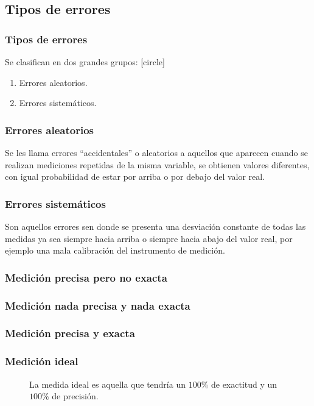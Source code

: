 \subsection{Tipos de errores}
\begin{frame}
\frametitle{Tipos de errores}
Se clasifican en dos grandes grupos:
[circle]
\begin{enumerate}[<+->]
\item Errores aleatorios.
\item Errores sistemáticos.
\end{enumerate}
\end{frame}
\begin{frame}
\frametitle{Errores aleatorios}
Se les llama errores \enquote{accidentales} o aleatorios a aquellos que aparecen cuando se realizan mediciones repetidas de la misma variable, se obtienen valores diferentes, con igual probabilidad de estar por arriba o por debajo del valor real.
\end{frame}
\begin{frame}
\frametitle{Errores sistemáticos}
Son aquellos errores sen donde se presenta una desviación constante de todas las medidas ya sea siempre hacia arriba o siempre hacia abajo del valor real, por ejemplo una mala calibración del instrumento de medición.
\end{frame}
\begin{frame}[plain]
\frametitle{Medición precisa pero no exacta}
\begin{figure}
    \centering
    
\end{figure}
\end{frame}
\begin{frame}[plain]
\frametitle{Medición nada precisa y nada exacta}
\begin{figure}
    \centering
    
\end{figure}
\end{frame}
\begin{frame}[plain]
\frametitle{Medición precisa y exacta}
\begin{figure}
    \centering
    
\end{figure}
\end{frame}
\begin{frame}[plain]
\frametitle{Medición ideal}
\begin{figure}
    \centering
    
    \caption{La medida ideal es aquella que tendría un $100\%$ de exactitud y un $100\%$ de precisión.}
\end{figure}
\end{frame}
